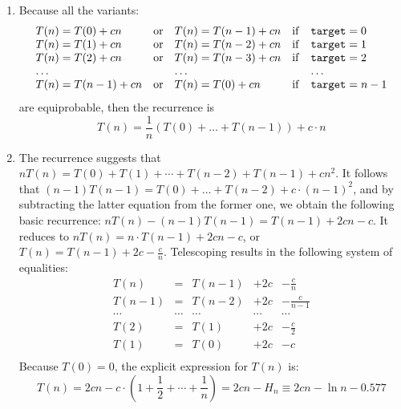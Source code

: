 \documentclass[]{article}
\begin{document}
\begin{enumerate}
\item
Because all the variants:
\[
\begin{array}{lllll}
T(n) = T(0) + cn & {\rm or} & 
T(n) = T(n-1) + cn &{\rm if} & {\tt target} = 0\\
T(n) = T(1) + cn & {\rm or} & 
T(n) = T(n-2) + cn &{\rm if} & {\tt target} = 1\\
T(n) = T(2) + cn & {\rm or} & 
T(n) = T(n-3) + cn &{\rm if} & {\tt target} = 2\\
\ldots & & \ldots & & \ldots \\
T(n) = T(n-1) + cn & {\rm or} & 
T(n) = T(0) + cn & {\rm if} & {\tt target} = n-1
\end{array}
\]
are equiprobable, then the recurrence is
\[
T(n) = \frac{1}{n}\left ( T(0) + \ldots + T(n-1) \right ) + c\cdot n
\]

\item
The recurrence suggests that 
$nT(n) = T(0)+T(1)+\cdots +T(n-2)+T(n-1) + cn^2$. It follows that
$(n-1)T(n-1) = T(0)+\ldots +T(n-2) + c\cdot (n-1)^{2}$, and by
subtracting the latter equation from the former one, we obtain the
following basic recurrence: $nT(n) - (n-1)T(n-1) = T(n-1) + 2cn - c$.
It reduces to $nT(n) = n\cdot T(n-1) + 2cn - c$, or 
$T(n) = T(n-1) + 2c - \frac{c}{n}$.
Telescoping results in the following system of equalities:
\[
\begin{array}{lllll}
T(n) & = & T(n-1)  & +  2c & - \frac{c}{n}\\
T(n-1) & = & T(n-2)  & + 2c  & - \frac{c}{n-1}\\
\cdots & \cdots & \cdots  &  \cdots & \cdots \\
T(2) & = & T(1)  & + 2c & - \frac{c}{2} \\
T(1) & = & T(0)  & + 2c & - c \\ 
\end{array}
\]
Because $T(0)=0$, the explicit expression for $T(n)$ is:
\[
T(n) = 2cn - c \cdot \left( 1+\frac{1}{2}+ \cdots + \frac{1}{n} \right )
= 2cn - H_{n} \equiv 2cn - \ln n - 0.577
\]


\end{enumerate}
\end{document}
